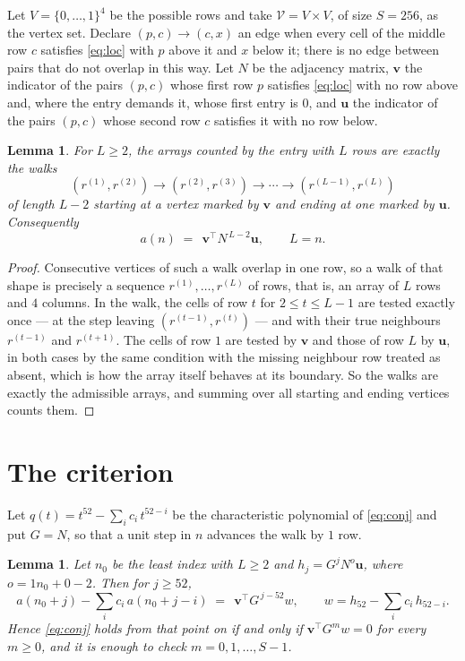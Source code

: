 \documentclass[11pt,a4paper]{article}
\theoremstyle{plain}
\newtheorem{lemma}[theorem]{Lemma}
\theoremstyle{definition}
\begin{document}
Let $V=\{0,\dots,1\}^{4}$ be the possible rows and take
$\mathcal V=V\times V$, of size $S=256$, as the vertex set. Declare $(p,c)\to(c,x)$ an edge
when every cell of the middle row $c$ satisfies \eqref{eq:loc} with $p$ above it and $x$
below it; there is no edge between pairs that do not overlap in this way. Let $N$ be the
adjacency matrix, $\mathbf{v}$ the indicator of the pairs $(p,c)$ whose first row $p$
satisfies \eqref{eq:loc} with no row above and, where the entry demands it, whose first entry is $0$, and $\mathbf{u}$ the indicator of
the pairs $(p,c)$ whose second row $c$ satisfies it with no row below.

\begin{lemma}\label{lem:walk}
For $L\ge2$, the arrays counted by the entry with $L$ rows are exactly the walks
\[
(r^{(1)},r^{(2)})\to(r^{(2)},r^{(3)})\to\cdots\to(r^{(L-1)},r^{(L)})
\]
of length $L-2$ starting at a vertex marked by $\mathbf{v}$ and ending at one marked by
$\mathbf{u}$. Consequently
\[
a(n)\;=\;\,\mathbf{v}^{\!\top}N^{\,L-2}\mathbf{u},\qquad L=n .
\]
\end{lemma}

\begin{proof}
Consecutive vertices of such a walk overlap in one row, so a walk of that shape is
precisely a sequence $r^{(1)},\dots,r^{(L)}$ of rows, that is, an array of $L$ rows
and $4$ columns. In the walk, the cells of row $t$ for $2\le t\le L-1$ are tested
exactly once --- at the step leaving $(r^{(t-1)},r^{(t)})$ --- and with their true
neighbours $r^{(t-1)}$ and $r^{(t+1)}$. The cells of row $1$ are tested by
$\mathbf{v}$ and those of row $L$ by $\mathbf{u}$, in both cases by the same condition
with the missing neighbour row treated as absent, which is how the array itself behaves at
its boundary. So the walks are exactly the admissible arrays, and summing over all starting
and ending vertices counts them.
\end{proof}

\section{The criterion}

Let $q(t)=t^{52}-\sum_i c_i\,t^{52-i}$ be the characteristic polynomial of
\eqref{eq:conj} and put $G=N$, so that a unit step in $n$ advances the walk by
$1$ row.

\begin{lemma}\label{lem:crit}
Let $n_0$ be the least index with $L\ge2$ and $h_j=G^{j}N^{o}\mathbf{u}$, where
$o=1n_0+0-2$. Then for $j\ge52$,
\[
a(n_0+j)-\sum_i c_i\,a(n_0+j-i)\;=\;\,\mathbf{v}^{\!\top}G^{\,j-52}w,
\qquad w=h_{52}-\sum_i c_i\,h_{52-i} .
\]
Hence \eqref{eq:conj} holds from that point on if and only if
$\mathbf{v}^{\!\top}G^{m}w=0$ for every $m\ge0$, and it is enough to check
$m=0,1,\dots,S-1$.
\end{lemma}
\end{document}
